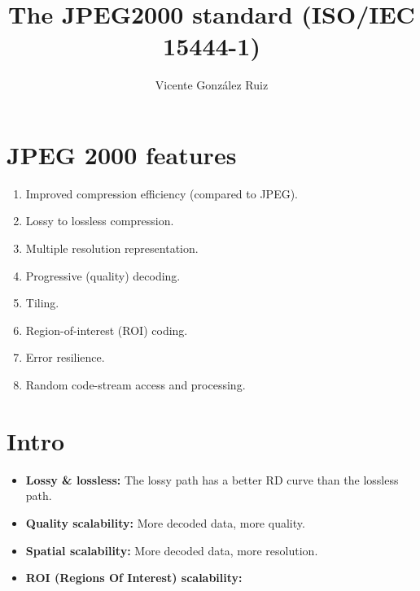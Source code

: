 
\title{The JPEG2000 standard (ISO/IEC 15444-1)}
\author{Vicente González Ruiz}
\maketitle
\tableofcontents

\section{JPEG 2000 features~\cite{rabbani2009jpeg}}
\begin{enumerate}
\item Improved compression efficiency (compared to JPEG).
\item Lossy to lossless compression.
\item Multiple resolution representation.
\item Progressive (quality) decoding.
\item Tiling.
\item Region-of-interest (ROI) coding.
\item Error resilience.
\item Random code-stream access and processing.
\end{enumerate}

\section{Intro~\cite{2002.taubman}}
\begin{itemize}
\item \textbf{Lossy \& lossless:} The lossy path has a better RD curve
  than the lossless path.
  \begin{center}
  \end{center}
\item \textbf{Quality scalability:} More decoded data, more quality.
  \begin{center}
  \end{center}
  
\item \textbf{Spatial scalability:} More decoded data, more
  resolution.
  \begin{center}
  \end{center}

\item \textbf{ROI (Regions Of Interest) scalability:}
  \begin{center}
  \end{center}

\end{itemize}

